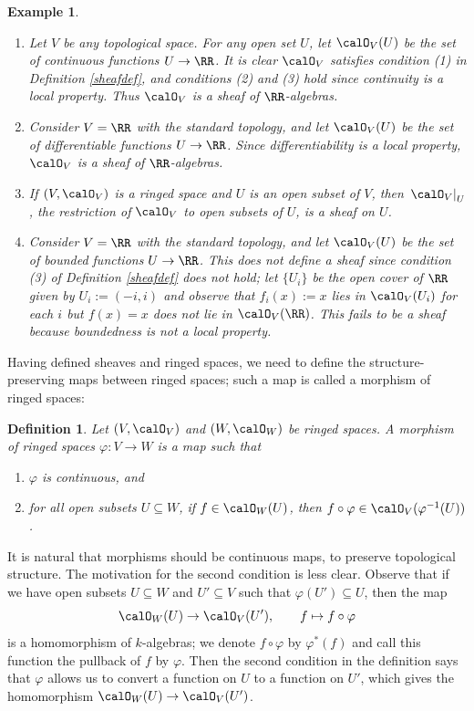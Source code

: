 \documentclass[12pt]{amsart}
\theoremstyle{plain}
\newtheorem{definition}[theorem]{Definition}
\newtheorem{example}[theorem]{Example}
\begin{document}
\begin{example}
\begin{enumerate}
\item
Let $V$ be any topological space.
For any open set $U$, let $\calO_V(U)$ be the set of continuous functions $U \to \RR$.
It is clear $\calO_V$ satisfies condition (1) in Definition \ref{sheafdef}, and conditions (2) and (3) hold since continuity is a local property. Thus $\calO_V$ is a sheaf of $\RR$-algebras.

\item
Consider $V = \RR$ with the standard topology, and let $\calO_V(U)$ be the set of differentiable functions $U \to \RR$.
Since differentiability is a local property, $\calO_V$ is a sheaf of $\RR$-algebras.

\item
If $(V, \calO_V)$ is a ringed space and $U$ is an open subset of $V$, then $\left. \calO_V \right|_U$, the restriction of $\calO_V$ to open subsets of $U$, is a sheaf on $U$.

\item
Consider $V = \RR$ with the standard topology, and let $\calO_V(U)$ be the set of bounded functions $U \to \RR$.
This does not define a sheaf since condition (3) of Definition \ref{sheafdef} does not hold;
let $\{U_i\}$ be the open cover of $\RR$ given by $U_i:=(-i, i)$ and observe that $f_i(x):=x$ lies in $\calO_V(U_i)$ for each $i$ but $f(x) = x$ does not lie in $\calO_V(\RR)$.
This fails to be a sheaf because boundedness is not a local property.
\end{enumerate}
\end{example}

Having defined sheaves and ringed spaces, we need to define the structure-preserving maps between ringed spaces;
such a map is called a morphism of ringed spaces:

\begin{definition}\label{definition:morphismringedspace}
Let $(V, \calO_V)$ and $(W, \calO_W)$ be ringed spaces.
A morphism of ringed spaces $\varphi : V \to W$ is a map such that
\begin{enumerate}
\item 
$\varphi$ is continuous, and
\item
for all open subsets $U \subseteq W$, if $f \in \calO_W(U)$, then $f\circ\varphi \in \calO_V(\varphi^{-1}(U))$.
\end{enumerate}
\end{definition}

It is natural that morphisms should be continuous maps, to preserve topological structure.
The motivation for the second condition is less clear.
Observe that if we have open subsets $U \subseteq W$ and $U' \subseteq V$ such that $\varphi(U')\subseteq U$, then the map
$$\calO_W(U) \to \calO_V(U'), \qquad f \mapsto f\circ\varphi$$
is a homomorphism of $k$-algebras;
we denote $f \circ \varphi$ by $\varphi^*(f)$ and call this function the pullback of $f$ by $\varphi$.
Then the second condition in the definition says that $\varphi$ allows us to convert a function on $U$ to a function on $U'$, which gives the homomorphism $\calO_W(U) \to \calO_V(U')$.
\end{document}
